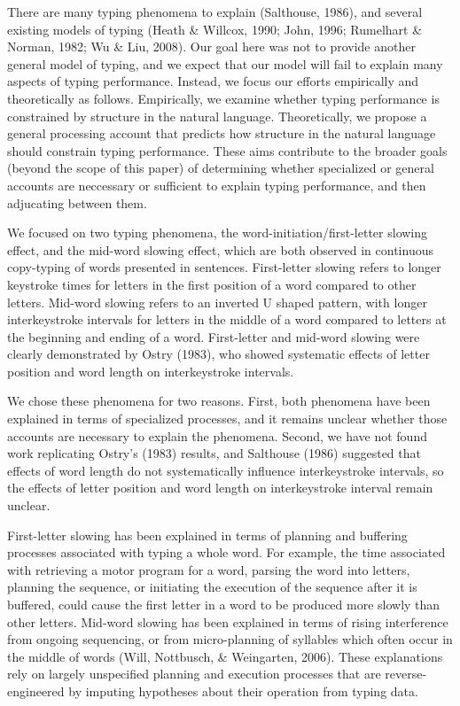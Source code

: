 \documentclass[floatsintext,man]{apa6}
\theoremstyle{definition}
\theoremstyle{definition}
\theoremstyle{definition}
\theoremstyle{remark}
\begin{document}
There are many typing phenomena to explain (Salthouse, 1986), and
several existing models of typing (Heath \& Willcox, 1990; John, 1996;
Rumelhart \& Norman, 1982; Wu \& Liu, 2008). Our goal here was not to
provide another general model of typing, and we expect that our model
will fail to explain many aspects of typing performance. Instead, we
focus our efforts empirically and theoretically as follows. Empirically,
we examine whether typing performance is constrained by structure in the
natural language. Theoretically, we propose a general processing account
that predicts how structure in the natural language should constrain
typing performance. These aims contribute to the broader goals (beyond
the scope of this paper) of determining whether specialized or general
accounts are neccessary or sufficient to explain typing performance, and
then adjucating between them.

We focused on two typing phenomena, the word-initiation/first-letter
slowing effect, and the mid-word slowing effect, which are both observed
in continuous copy-typing of words presented in sentences. First-letter
slowing refers to longer keystroke times for letters in the first
position of a word compared to other letters. Mid-word slowing refers to
an inverted U shaped pattern, with longer interkeystroke intervals for
letters in the middle of a word compared to letters at the beginning and
ending of a word. First-letter and mid-word slowing were clearly
demonstrated by Ostry (1983), who showed systematic effects of letter
position and word length on interkeystroke intervals.

We chose these phenomena for two reasons. First, both phenomena have
been explained in terms of specialized processes, and it remains unclear
whether those accounts are necessary to explain the phenomena. Second,
we have not found work replicating Ostry's (1983) results, and Salthouse
(1986) suggested that effects of word length do not systematically
influence interkeystroke intervals, so the effects of letter position
and word length on interkeystroke interval remain unclear.

First-letter slowing has been explained in terms of planning and
buffering processes associated with typing a whole word. For example,
the time associated with retrieving a motor program for a word, parsing
the word into letters, planning the sequence, or initiating the
execution of the sequence after it is buffered, could cause the first
letter in a word to be produced more slowly than other letters. Mid-word
slowing has been explained in terms of rising interference from ongoing
sequencing, or from micro-planning of syllables which often occur in the
middle of words (Will, Nottbusch, \& Weingarten, 2006). These
explanations rely on largely unspecified planning and execution
processes that are reverse-engineered by imputing hypotheses about their
operation from typing data.
\end{document}
